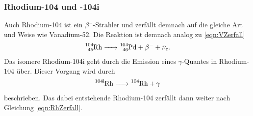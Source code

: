 \subsubsection*{Rhodium-104 und -104i}
Auch Rhodium-104 ist ein $\beta^-$-Strahler und zerfällt demnach auf die gleiche Art und Weise wie 
Vanadium-52. Die Reaktion ist demnach analog zu \ref{eqn:VZerfall}
\begin{equation}
    \ce{^{104}_{45}Rh -> ^{104}_{46}Pd}+\beta^-+\bar{\nu}_e. 
    \label{eqn:RhZerfall}
\end{equation}
Das isomere Rhodium-104i geht durch die Emission eines $\gamma$-Quantes in Rhodium-104 über. Dieser 
Vorgang wird durch
\begin{equation}
    \ce{^{104 i}Rh -> ^{104}Rh}+\gamma 
    \label{eqn:Rh-104i}
\end{equation}
beschrieben. Das dabei entstehende Rhodium-104 zerfällt dann weiter nach Gleichung \ref{eqn:RhZerfall}.
